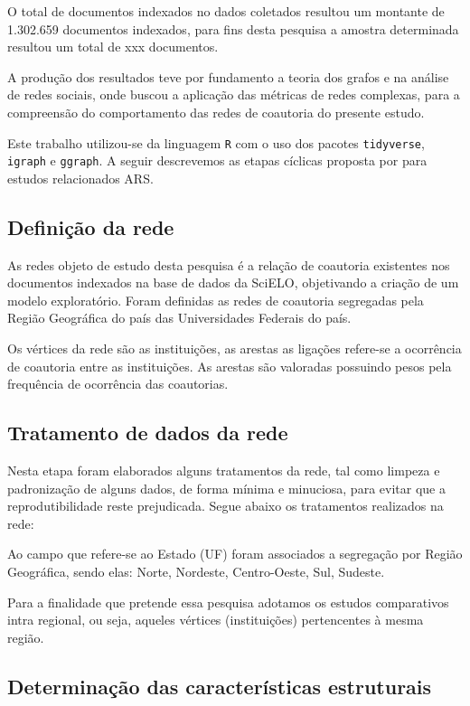 \documentclass[12pt]{article}
\begin{document}
O total de documentos indexados no dados coletados resultou um montante de 1.302.659 documentos indexados, para fins desta pesquisa a amostra determinada resultou um total de xxx documentos.

A produção dos resultados teve por fundamento a teoria dos grafos e na análise de redes sociais, onde buscou a aplicação das métricas de redes complexas, para a compreensão do comportamento das redes de coautoria do presente estudo.

Este trabalho utilizou-se da linguagem \texttt R com o uso dos pacotes \texttt{tidyverse}, \texttt{igraph} e \texttt{ggraph}. A seguir descrevemos as etapas cíclicas proposta por \cite{de2018exploratory} para estudos relacionados ARS.

\subsection{Definição da rede}

As redes objeto de estudo desta pesquisa é a relação de coautoria existentes nos documentos indexados na base de dados da SciELO, objetivando a criação de um modelo exploratório. Foram definidas as redes de coautoria segregadas pela Região Geográfica do país das Universidades Federais do país.

Os vértices da rede são as instituições, as arestas as ligações refere-se a ocorrência de coautoria entre as instituições. As arestas são valoradas possuindo pesos pela frequência de ocorrência das coautorias.


\subsection{Tratamento de dados da rede}

Nesta etapa foram elaborados alguns tratamentos da rede, tal como limpeza e padronização de alguns dados, de forma mínima e minuciosa, para evitar que a reprodutibilidade reste prejudicada. Segue abaixo os tratamentos realizados na rede:

Ao campo que refere-se ao Estado (UF) foram associados a segregação por Região Geográfica, sendo elas: Norte, Nordeste, Centro-Oeste, Sul, Sudeste. 

Para a finalidade que pretende essa pesquisa adotamos os estudos comparativos intra regional, ou seja, aqueles vértices (instituições) pertencentes à mesma região.

\subsection{Determinação das características estruturais}
\end{document}
